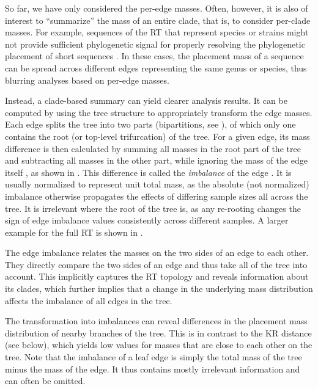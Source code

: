 So far, we have only considered the per-edge masses.
Often, however, it is also of interest to ``summarize'' the mass of an entire clade, that is, to consider per-clade masses.
For example, sequences of the \ac{RT} that represent species or strains might not provide sufficient phylogenetic signal
for properly resolving the phylogenetic placement of short sequences \cite{Dunthorn2014}.
In these cases, the placement mass of a sequence can be spread across different edges representing the same genus or species,
thus blurring analyses based on per-edge masses.

Instead, a clade-based summary can yield clearer analysis results.
It can be computed by using the tree structure to appropriately transform the edge masses.
Each edge splits the tree into two parts
(bipartitions, see ),
of which only one contains the root (or top-level trifurcation) of the tree.
For a given edge, its mass difference is then calculated by summing all masses in the root part of the tree
and subtracting all masses in the other part,
while ignoring the mass of the edge itself \cite{Matsen2011a}, as shown in .
This difference is called the \emph{imbalance} of the edge \cite{Matsen2011a}.
It is usually normalized to represent unit total mass,
as the absolute (not normalized) imbalance otherwise propagates the effects of differing sample sizes all across the tree.
It is irrelevant where the root of the tree is,
as any re-rooting changes the sign of edge imbalance values consistently across different samples.
A larger example for the full \ac{RT} is shown in .

The edge imbalance relates the masses on the two sides of an edge to each other.
They directly compare the two sides of an edge and thus take all of the tree into account.
This implicitly captures the \ac{RT} topology and reveals information about its clades,
which further implies that a change in the underlying mass distribution affects the imbalance of all edges in the tree.

The transformation into imbalances can reveal differences in the placement mass distribution
of nearby branches of the tree.
This is in contrast to the KR distance (see  below),
which yields low values for masses that are close to each other on the tree.
Note that %
the imbalance of a leaf edge is simply the total mass of the tree minus the mass of the edge.
It thus contains mostly irrelevant information and can often be omitted.

